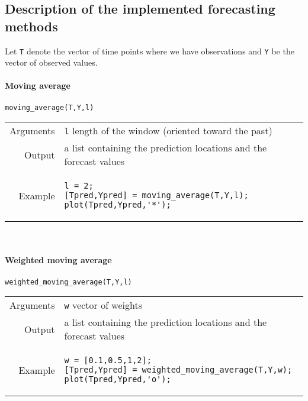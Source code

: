 \documentclass[11pt]{scrartcl}
\begin{document}
\subsection*{Description of the implemented forecasting methods}
Let \verb!T! denote the vector of time points where we have observations and \verb!Y! be the vector of observed values.

\paragraph{Moving average} \verb!moving_average(T,Y,l)!\\
\begin{tabular}{rl}
	Arguments & \verb!l! length of the window (oriented toward the past)\\ \vspace{4mm}
	Output & a list containing the prediction locations and the forecast values\\ \vspace{4mm}
	Example & 
	\begin{minipage}{10cm}	
	\begin{verbatim}
l = 2;
[Tpred,Ypred] = moving_average(T,Y,l);
plot(Tpred,Ypred,'*');
	\end{verbatim}
	\end{minipage}
\end{tabular}\\

\paragraph{Weighted moving average} \verb!weighted_moving_average(T,Y,l)!\\
\begin{tabular}{rl}
	Arguments & \verb!w! vector of weights\\ \vspace{4mm}
	Output & a list containing the prediction locations and the forecast values\\ \vspace{4mm}
	Example & 
	\begin{minipage}{10cm}	
	\begin{verbatim}
w = [0.1,0.5,1,2];
[Tpred,Ypred] = weighted_moving_average(T,Y,w);
plot(Tpred,Ypred,'o');
	\end{verbatim}
	\end{minipage}
\end{tabular}\\
\end{document}
